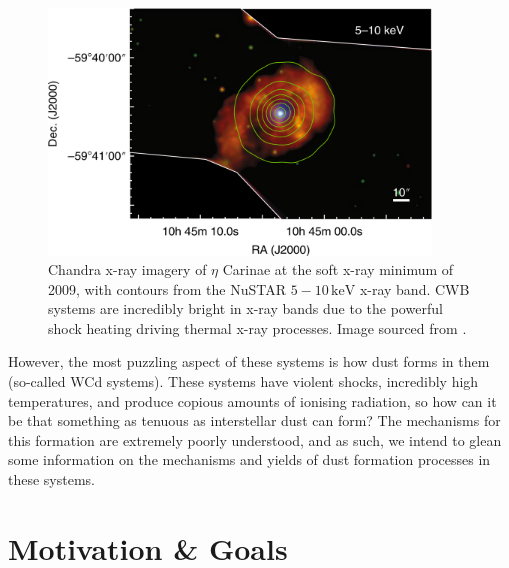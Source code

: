 \begin{figure}[ht]
  \centering
  \includegraphics[width=4in]{assets/wolf-rayets/x-ray.png}
  \caption[\emph{Chandra \& NuSTAR imagery of $\eta$ Carinae \parencite{hamaguchiNonthermalXraysColliding2018}}]{Chandra x-ray imagery of $\eta$ Carinae at the soft x-ray minimum of 2009, with contours from the NuSTAR $5-10 \, \si{\kilo\electronvolt}$ x-ray band. CWB systems are incredibly bright in x-ray bands due to the powerful shock heating driving thermal x-ray processes. Image sourced from \textcite{hamaguchiNonthermalXraysColliding2018}.}
  \label{fig:intro-xray}
\end{figure}

However, the most puzzling aspect of these systems is how dust forms in them (so-called WCd systems).
These systems have violent shocks, incredibly high temperatures, and produce copious amounts of ionising radiation, so how can it be that something as tenuous as interstellar dust can form?
The mechanisms for this formation are extremely poorly understood, and as such, we intend to glean some information on the mechanisms and yields of dust formation processes in these systems.

\section{Motivation \& Goals}
\label{sec:projectgoals}

